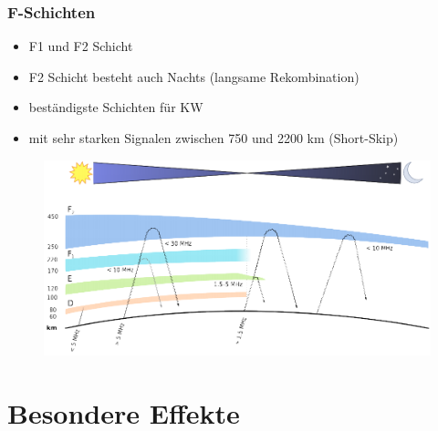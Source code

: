 \begin{frame}
  \frametitle{F-Schichten}
  \begin{itemize}
    \item F1 und F2 Schicht
    \item F2 Schicht besteht auch Nachts (langsame Rekombination)
    \item beständigste Schichten für KW
    \item mit sehr starken Signalen zwischen 750 und 2200 km (Short-Skip)
  \end{itemize}
  \begin{center}
    \begin{figure}
      \includegraphics[width=.75\textwidth,height=.5\textheight,keepaspectratio]{a08/schichten_behelf_43.png}
    \end{figure}
  \end{center}
\end{frame}

\section*{Besondere Effekte}

